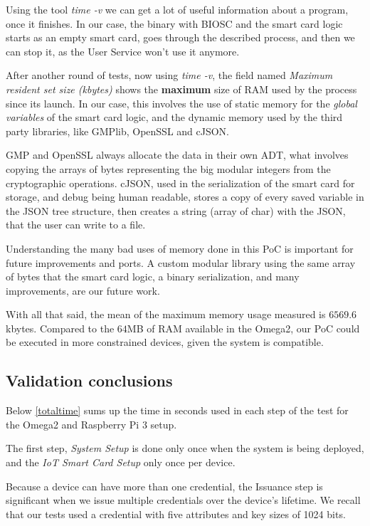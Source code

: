 \documentclass[journal]{IEEEtran}
\begin{document}
Using the tool \textit{time -v} we can get a lot of useful information about a program, once it finishes. In our case, the binary with BIOSC and the smart card logic starts as an empty smart card, goes through the described process, and then we can stop it, as the User Service won't use it anymore.

After another round of tests, now using \textit{time -v}, the field named \textit{Maximum resident set size (kbytes)} shows the \textbf{maximum} size of RAM used by the process since its launch. In our case, this involves the use of static memory for the \textit{global variables} of the smart card logic, and the dynamic memory used by the third party libraries, like GMPlib, OpenSSL and cJSON.

GMP and OpenSSL always allocate the data in their own ADT, what involves copying the arrays of bytes representing the big modular integers from the cryptographic operations. cJSON, used in the serialization of the smart card for storage, and debug being human readable, stores a copy of every saved variable in the JSON tree structure, then creates a string (array of char) with the JSON, that the user can write to a file.

Understanding the many bad uses of memory done in this PoC is important for future improvements and ports. A custom modular library using the same array of bytes that the smart card logic, a binary serialization, and many improvements, are our future work.

With all that said, the mean of the maximum memory usage measured is $6569.6$ kbytes. Compared to the $64$MB of RAM available in the Omega2, our PoC could be executed in more constrained devices, given the system is compatible.




\subsection{Validation conclusions}

Below \autoref{totaltime} sums up the time in seconds used in each step of the test for the Omega2 and Raspberry Pi 3 setup.

The first step, \textit{System Setup} is done only once when the system is being deployed, and the \textit{IoT Smart Card Setup} only once per device.

Because a device can have more than one credential, the Issuance step is significant when we issue multiple credentials over the device's lifetime. We recall that our tests used a credential with five attributes and key sizes of 1024 bits.
\end{document}
